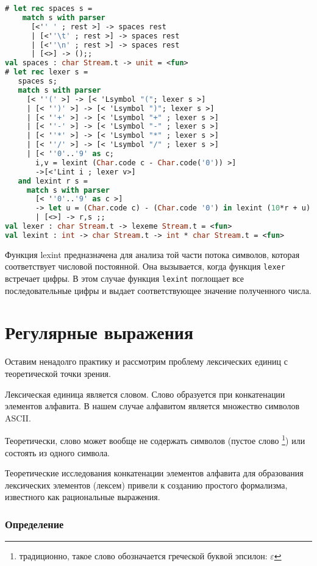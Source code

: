 \begin{lstlisting}[language=Caml]
# let rec spaces s =
    match s with parser
      [<'' ' ; rest >] -> spaces rest
      | [<''\t' ; rest >] -> spaces rest
      | [<''\n' ; rest >] -> spaces rest
      | [<>] -> ();;
val spaces : char Stream.t -> unit = <fun>
# let rec lexer s =
   spaces s;
   match s with parser
     [< ''(' >] -> [< 'Lsymbol "("; lexer s >]
     | [< '')' >] -> [< 'Lsymbol ")"; lexer s >]
     | [< ''+' >] -> [< 'Lsymbol "+" ; lexer s >]
     | [< ''-' >] -> [< 'Lsymbol "-" ; lexer s >]
     | [< ''*' >] -> [< 'Lsymbol "*" ; lexer s >]
     | [< ''/' >] -> [< 'Lsymbol "/" ; lexer s >]
     | [< ''0'..'9' as c;
       i,v = lexint (Char.code c - Char.code('0')) >]
       ->[<'Lint i ; lexer v>]
   and lexint r s =
     match s with parser
       [< ''0'..'9' as c >]
       -> let u = (Char.code c) - (Char.code '0') in lexint (10*r + u) s
       | [<>] -> r,s ;;
val lexer : char Stream.t -> lexeme Stream.t = <fun>
val lexint : int -> char Stream.t -> int * char Stream.t = <fun>
\end{lstlisting}

Функция lexint предназначена для анализа той части потока символов, которая
соответствует числовой постоянной. Она вызывается, когда функция \texttt{lexer}
встречает цифры. В этом случае функция \texttt{lexint} поглощает все
последовательные цифры и выдает соответствующее значение полученного числа.

\section{Регулярные выражения}

Оставим ненадолго практику и рассмотрим проблему лексических единиц с
теоретической точки зрения.

Лексическая единица является словом. Слово образуется при конкатенации элементов
алфавита. В нашем случае алфавитом является множество символов ASCII.

Теоретически, слово может вообще не содержать символов (пустое слово
\footnote{традиционно, такое слово обозначается греческой буквой эпсилон:
$\varepsilon$}) или состоять из одного символа.

Теоретические исследования конкатенации элементов алфавита для образования
лексических элементов (лексем) привели к созданию простого формализма,
известного как рациональные выражения.

\subsubsection{Определение}

